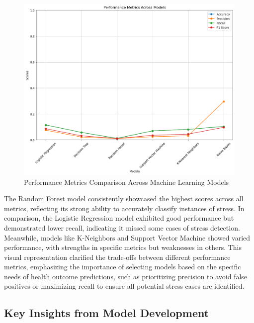 \documentclass[runningheads]{llncs}
\begin{document}
\begin{enumerate}
\newpage
\begin{figure}
    \centering
    \includegraphics[width=1.0\linewidth]{modeling 8.png}
    \caption{Performance Metrics Comparison Across Machine Learning Models} 
    \label{fig:enter-label}
\end{figure}

The Random Forest model consistently showcased the highest scores across all metrics, reflecting its strong ability to accurately classify instances of stress. In comparison, the Logistic Regression model exhibited good performance but demonstrated lower recall, indicating it missed some cases of stress detection. Meanwhile, models like K-Neighbors and Support Vector Machine showed varied performance, with strengths in specific metrics but weaknesses in others. This visual representation clarified the trade-offs between different performance metrics, emphasizing the importance of selecting models based on the specific needs of health outcome predictions, such as prioritizing precision to avoid false positives or maximizing recall to ensure all potential stress cases are identified.

\subsection{Key Insights from Model Development}


\end{enumerate}
\end{document}
